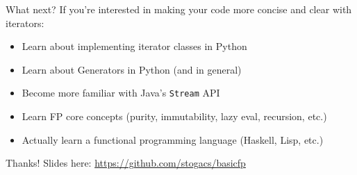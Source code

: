 \documentclass[../index.tex]{subfiles}
\begin{document}
\renewcommand{\currenttitle}{What next?}
\begin{frame}{\currenttitle}
  If you're interested in making your code more concise and clear with
  iterators: \\[1em]

  \begin{itemize}
    \item Learn about implementing iterator classes in Python
    \item Learn about Generators in Python (and in general)
    \item Become more familiar with Java's \texttt{Stream} API
    \item Learn FP core concepts (purity, immutability, lazy eval, recursion, etc.)
    \item Actually learn a functional programming language (Haskell, Lisp, etc.)
  \end{itemize}
\end{frame}

\renewcommand{\currenttitle}{Thanks!}
\begin{frame}[fragile]{\currenttitle}
  Slides here: \url{https://github.com/stogacs/basicfp}
\end{frame}
\end{document}

